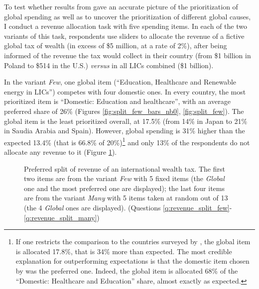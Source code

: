 \documentclass[12pt,english]{article}
\begin{document}
\begin{bibunit}
To test whether results from \citep{fabre_majority_2025} gave an accurate picture of the %
prioritization of global spending as well as to uncover the prioritization of different global causes, I conduct a revenue allocation task with five spending items. 
In each of the two variants of this task, respondents use sliders to allocate the revenue of a fictive global tax of wealth (in excess of \$5 million, at a rate of 2\%), after being informed of the revenue the tax would collect in their country (from \$1 billion in Poland to \$514 in the U.S.) \textit{versus} in all LICs combined (\$1 billion). 

In the variant \textit{Few}, one global item (``Education, Healthcare and Renewable energy in LICs'') competes with four domestic ones. %
In every country, the most prioritized item is ``Domestic: Education and healthcare'', with an average preferred share of 26\% (Figures \ref{fig:split_few_bars_nb0}, \ref{fig:split_few}). The global item is the least prioritized overall, at 17.5\% (from 14\% in Japan to 21\% in Saudia Arabia and Spain). However, global spending is 31\% higher than the expected 13.4\% (that is 66.8\% of %
20\%)\footnote{If one restricts the comparison to the countries surveyed by \citep{fabre_majority_2025}, the global item is allocated 17.8\%, that is 34\% more than expected. The most credible explanation for outperforming expectations is that the domestic item chosen by \citep{fabre_majority_2025} was the preferred one. Indeed, the global item is allocated 68\% of the ``Domestic: Healthcare and Education'' share, almost exactly as expected.} and only 13\% of the respondents do not allocate any revenue to it (Figure \ref{fig:split}). 


\begin{figure}[h!]
  \caption[Preferred split of revenue of an international wealth tax]{Preferred split of revenue of an international wealth tax. The first two items are from the variant \textit{Few} with 5 fixed items (the \textit{Global} one and the most preferred one are displayed); the last four items are from the variant \textit{Many} with 5 items taken at random out of 13 (the 4 \textit{Global} ones are displayed). \hfill (Questions \ref{q:revenue_split_few}-\ref{q:revenue_split_many})} \label{fig:split}


\end{figure}
\end{bibunit}
\end{document}
